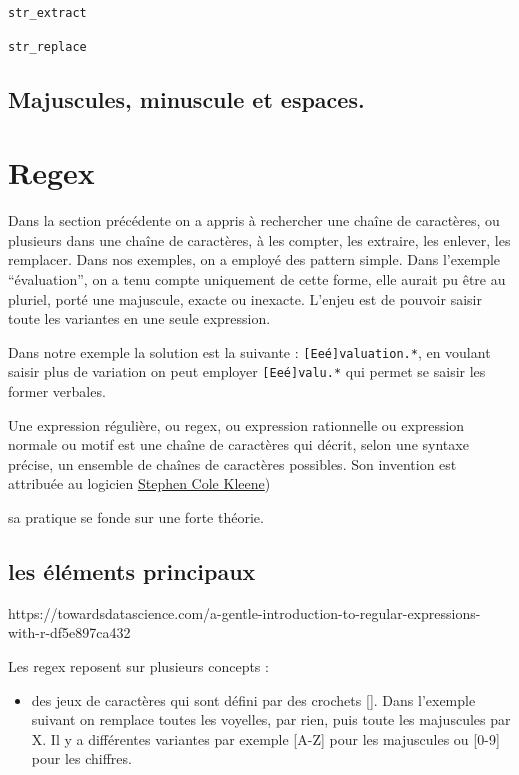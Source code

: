 \documentclass[
  letterpaper,
  DIV=11,
  numbers=noendperiod]{scrreprt}
\providecommand{\tightlist}{%
  \setlength{\itemsep}{0pt}\setlength{\parskip}{0pt}}\usepackage{longtable,booktabs,array}
\begin{document}
\texttt{str\_extract}

\texttt{str\_replace}

\subsection{Majuscules, minuscule et
espaces.}\label{majuscules-minuscule-et-espaces.}

\section{Regex}\label{regex}

Dans la section précédente on a appris à rechercher une chaîne de
caractères, ou plusieurs dans une chaîne de caractères, à les compter,
les extraire, les enlever, les remplacer. Dans nos exemples, on a
employé des pattern simple. Dans l'exemple ``évaluation'', on a tenu
compte uniquement de cette forme, elle aurait pu être au pluriel, porté
une majuscule, exacte ou inexacte. L'enjeu est de pouvoir saisir toute
les variantes en une seule expression.

Dans notre exemple la solution est la suivante :
\texttt{{[}E\textbar{}e\textbar{}é{]}valuation.*}, en voulant saisir
plus de variation on peut employer
\texttt{{[}E\textbar{}e\textbar{}é{]}valu.*} qui permet se saisir les
former verbales.

Une expression régulière, ou regex, ou expression rationnelle ou
expression normale ou motif est une chaîne de caractères qui décrit,
selon une syntaxe précise, un ensemble de chaînes de caractères
possibles. Son invention est attribuée au logicien
\href{https://fr.wikipedia.org/wiki/Stephen_Cole_Kleene}{Stephen Cole
Kleene})

sa pratique se fonde sur une forte théorie.

\subsection{les éléments
principaux}\label{les-uxe9luxe9ments-principaux}

https://towardsdatascience.com/a-gentle-introduction-to-regular-expressions-with-r-df5e897ca432

Les regex reposent sur plusieurs concepts :

\begin{itemize}
\tightlist
\item
  des jeux de caractères qui sont défini par des crochets {[}{]}. Dans
  l'exemple suivant on remplace toutes les voyelles, par rien, puis
  toute les majuscules par X. Il y a différentes variantes par exemple
  {[}A-Z{]} pour les majuscules ou {[}0-9{]} pour les chiffres.
\end{itemize}
\end{document}
